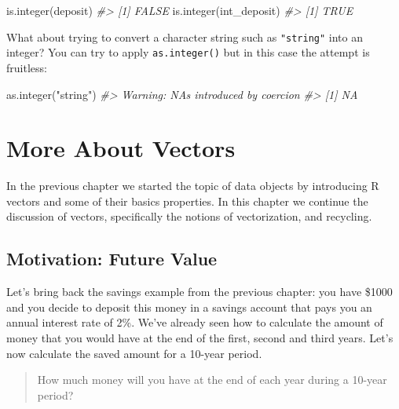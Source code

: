\documentclass[
]{book}
\newenvironment{Shaded}{\begin{snugshade}}{\end{snugshade}}
\newcommand{\CommentTok}[1]{\textcolor[rgb]{0.56,0.35,0.01}{\textit{#1}}}
\newcommand{\FunctionTok}[1]{\textcolor[rgb]{0.00,0.00,0.00}{#1}}
\newcommand{\NormalTok}[1]{#1}
\newcommand{\StringTok}[1]{\textcolor[rgb]{0.31,0.60,0.02}{#1}}
\begin{document}
\begin{Shaded}
\begin{Highlighting}[]
\FunctionTok{is.integer}\NormalTok{(deposit)}
\CommentTok{\#\textgreater{} [1] FALSE}
\FunctionTok{is.integer}\NormalTok{(int\_deposit)}
\CommentTok{\#\textgreater{} [1] TRUE}
\end{Highlighting}
\end{Shaded}

What about trying to convert a character string such as \texttt{"string"} into an
integer? You can try to apply \texttt{as.integer()} but in this case the attempt is
fruitless:

\begin{Shaded}
\begin{Highlighting}[]
\FunctionTok{as.integer}\NormalTok{(}\StringTok{"string"}\NormalTok{)}
\CommentTok{\#\textgreater{} Warning: NAs introduced by coercion}
\CommentTok{\#\textgreater{} [1] NA}
\end{Highlighting}
\end{Shaded}

\hypertarget{more-about-vectors}{%
\chapter{More About Vectors}\label{more-about-vectors}}

In the previous chapter we started the topic of data objects by introducing
R vectors and some of their basics properties. In this chapter we continue the
discussion of vectors, specifically the notions of vectorization, and
recycling.

\hypertarget{motivation-future-value}{%
\section{Motivation: Future Value}\label{motivation-future-value}}

Let's bring back the savings example from the previous chapter: you have \$1000
and you decide to deposit this money in a savings account that pays you an
annual interest rate of 2\%. We've already seen how to calculate the amount of
money that you would have at the end of the first, second and third years. Let's
now calculate the saved amount for a 10-year period.

\begin{quote}
How much money will you have at the end of each year during a 10-year period?
\end{quote}
\end{document}
